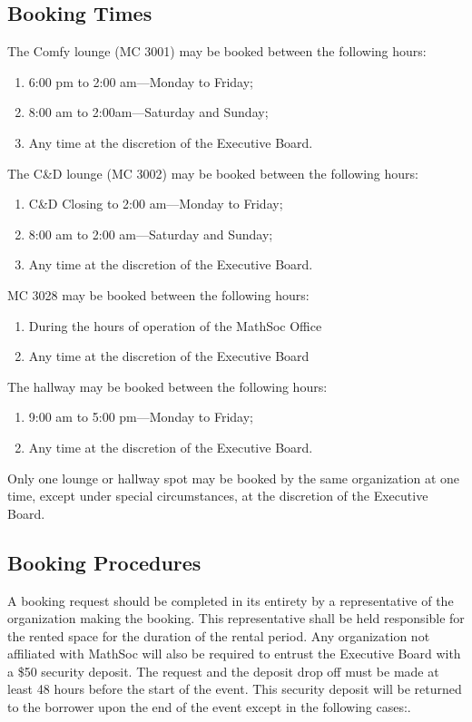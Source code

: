 \subsection{Booking Times}

\noindent The Comfy lounge (MC 3001) may be booked between the following hours:
\begin{enumerate}
	\item 6:00 pm to 2:00 am---Monday to Friday;
	\item 8:00 am to 2:00am---Saturday and Sunday;
	\item Any time at the discretion of the Executive Board.
\end{enumerate}

\noindent The C\&D lounge (MC 3002) may be booked between the following hours:
\begin{enumerate}
	\item C\&D Closing to 2:00 am---Monday to Friday;
	\item 8:00 am to 2:00 am---Saturday and Sunday;
	\item Any time at the discretion of the Executive Board.
\end{enumerate}

\noindent MC 3028 may be booked between the following hours:
\begin{enumerate}
	\item During the hours of operation of the MathSoc Office
	\item Any time at the discretion of the Executive Board
\end{enumerate}

\noindent The hallway may be booked between the following hours:
\begin{enumerate}
	\item 9:00 am to 5:00 pm---Monday to Friday;
	\item Any time at the discretion of the Executive Board.
\end{enumerate}

\noindent Only one lounge or hallway spot may be booked by the same organization at one
time, except under special circumstances, at the discretion of the Executive
Board.

\subsection{Booking Procedures}

A booking request should be completed in its entirety by a representative of the organization
making the booking. This representative shall be held responsible for the rented space for the
duration of the rental period. Any organization not affiliated with MathSoc will also be required
to entrust the Executive Board with a \$50 security deposit. The request and the deposit drop off
must be made at least 48 hours before the start of the event. This security deposit will be
returned to the borrower upon the end of the event except in the following cases:.

